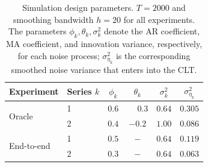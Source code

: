 \begin{table}[ht]
\centering
\caption{Simulation design parameters. $T = 2000$ and smoothing bandwidth
  $h = 20$ for all experiments. The parameters $\phi_k, \theta_k, \sigma_k^2$ denote the AR coefficient, MA coefficient, and innovation variance, respectively, for each noise process; $\sigma^2_{\eta_k}$ is the corresponding smoothed noise variance that enters into the CLT.}
\label{tab:sim-params}
\begin{tabular}{llcccc}
  \toprule
  Experiment & Series $k$ & $\phi_k$ & $\theta_k$ & $\sigma^2_k$ & $\sigma^2_{\eta_k}$ \\
  \midrule
  \multirow{2}{*}{Oracle}
    & 1 & $0.6$ & $\phantom{-}0.3$  & $0.64$ & $0.305$ \\
    & 2 & $0.4$ & $-0.2$ & $1.00$ & $0.086$ \\
  \midrule
  \multirow{2}{*}{End-to-end}
    & 1 & $0.5$ & $-$ & $0.64$ & $0.119$ \\
    & 2 & $0.3$ & $-$ & $0.64$ & $0.063$ \\
  \bottomrule
\end{tabular}
\end{table}


